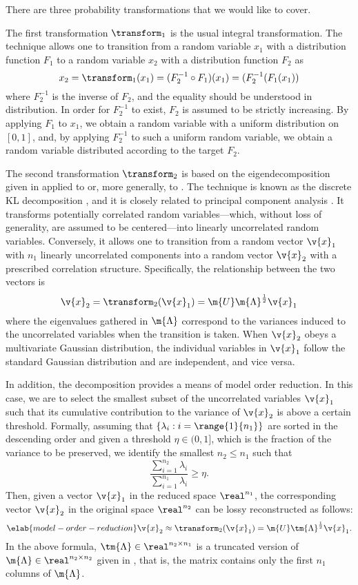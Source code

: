 There are three probability transformations that we would like to cover.

The first transformation $\transform_1$ is the usual integral transformation.
The technique allows one to transition from a random variable $x_1$ with a
distribution function $F_1$ to a random variable $x_2$ with a distribution
function $F_2$ as
\[
  x_2 = \transform_1(x_1) = (F_2^{-1} \circ F_1)(x_1) = (F_2^{-1}(F_1(x_1))
\]
where $F_2^{-1}$ is the inverse of $F_2$, and the equality should be understood
in distribution. In order for $F_2^{-1}$ to exist, $F_2$ is assumed to be
strictly increasing. By applying $F_1$ to $x_1$, we obtain a random variable
with a uniform distribution on $[0, 1]$, and, by applying $F_2^{-1}$ to such a
uniform random variable, we obtain a random variable distributed according to
the target $F_2$.

The second transformation $\transform_2$ is based on the eigendecomposition
given in  applied to  or, more
generally, to . The technique is known as the discrete
\acf{KL} decomposition \cite{ghanem1991, xiu2010}, and it is closely related to
principal component analysis \cite{hastie2013}. It transforms potentially
correlated random variables---which, without loss of generality, are assumed to
be centered---into linearly uncorrelated random variables. Conversely, it allows
one to transition from a random vector $\v{x}_1$ with $n_1$ linearly
uncorrelated components into a random vector $\v{x}_2$ with a prescribed
correlation structure. Specifically, the relationship between the two vectors is
\[
  \v{x}_2 = \transform_2(\v{x}_1) = \m{U} \m{\Lambda}^\frac{1}{2} \v{x}_1
\]
where the eigenvalues gathered in $\m{\Lambda}$ correspond to the variances
induced to the uncorrelated variables when the transition is taken. When
$\v{x}_2$ obeys a multivariate Gaussian distribution, the individual variables
in $\v{x}_1$ follow the standard Gaussian distribution and are independent, and
vice versa.

In addition, the decomposition provides a means of model order reduction. In
this case, we are to select the smallest subset of the uncorrelated variables
$\v{x}_1$ such that its cumulative contribution to the variance of $\v{x}_2$ is
above a certain threshold. Formally, assuming that $\{ \lambda_i: i =
\range{1}{n_1} \}$ are sorted in the descending order and given a threshold
$\eta \in (0, 1]$, which is the fraction of the variance to be preserved, we
identify the smallest $n_2 \leq n_1$ such that
\[
  \frac{\sum_{i = 1}^{n_2} \lambda_i}{\sum_{i = 1}^{n_1} \lambda_i} \geq \eta.
\]
Then, given a vector $\v{x}_1$ in the reduced space $\real^{n_1}$, the
corresponding vector $\v{x}_2$ in the original space $\real^{n_2}$ can be lossy
reconstructed as follows:
\begin{equation} \elab{model-order-reduction}
  \v{x}_2 \approx \transform_2(\v{x}_1) = \m{U} \tm{\Lambda}^\frac{1}{2} \v{x}_1.
\end{equation}
In the above formula, $\tm{\Lambda} \in \real^{n_2 \times n_1}$ is a truncated
version of $\m{\Lambda} \in \real^{n_2 \times n_2}$ given in
, that is, the matrix contains only the first $n_1$
columns of $\m{\Lambda}$.


